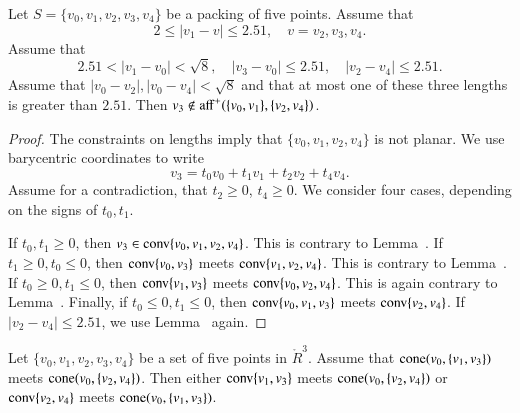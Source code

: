 \begin{tarskidata}
\begin{tarski}
\begin{lemma}
Let $S=\{v_0,v_1,v_2,v_3,v_4\}$ be a packing of five points.
Assume that
  $$2\le |v_1-v|\le 2.51,\quad v = v_2,v_3,v_4.$$
Assume that
  $$2.51 < |v_1-v_0| < \sqrt8,\quad |v_3-v_0|\le 2.51,
   \quad |v_2-v_4|\le2.51.$$
Assume that $|v_0-v_2|,|v_0-v_4|<\sqrt8$ and that
at most one of these three lengths is greater than $2.51$.
Then $v_3\not\in{\operatorname{aff}}^+(\{v_0,v_1\},\{v_2,v_4\})$.
\end{lemma}



\begin{proof}
The constraints on lengths imply that $\{v_0,v_1,v_2,v_4\}$
is not planar.  We use barycentric 
coordinates to write
  $$
  v_3 = t_0 v_0 + t_1 v_1 + t_2 v_2 + t_4 v_4.
  $$
Assume for a contradiction, that $t_2\ge0$, $t_4\ge0$.
We consider four cases, depending on the signs of $t_0,t_1$.

If $t_0,t_1\ge0$, then $v_3\in{\operatorname{conv}}\{v_0,v_1,v_2,v_4\}$.
This is contrary to Lemma~.
If $t_1\ge0,t_0\le0$, then ${\operatorname{conv}}\{v_0,v_3\}$ meets
${\operatorname{conv}}\{v_1,v_2,v_4\}$.  
This is contrary to Lemma~.
If $t_0\ge0,t_1\le0$, then ${\operatorname{conv}}\{v_1,v_3\}$ meets
${\operatorname{conv}}\{v_0,v_2,v_4\}$.  
This is again contrary to Lemma~.  Finally, if
$t_0\le0,t_1\le0$, then ${\operatorname{conv}}\{v_0,v_1,v_3\}$ meets 
${\operatorname{conv}}\{v_2,v_4\}$.  
If $|v_2-v_4|\le 2.51$, we use Lemma~ again.
\end{proof}
\end{tarski}





\begin{tarski}

\begin{lemma}
Let $\{v_0,v_1,v_2,v_3,v_4\}$ be a set of five points in $\ring{R}^3$.
Assume that ${\operatorname{cone}}(v_0,\{v_1,v_3\})$ meets
  ${\operatorname{cone}}(v_0,\{v_2,v_4\})$.  Then either
${\operatorname{conv}}\{v_1,v_3\}$ meets ${\operatorname{cone}}(v_0,\{v_2,v_4\})$ or
${\operatorname{conv}}\{v_2,v_4\}$ meets ${\operatorname{cone}}(v_0,\{v_1,v_3\})$.
\end{lemma}


\end{tarski}
\end{tarskidata}
